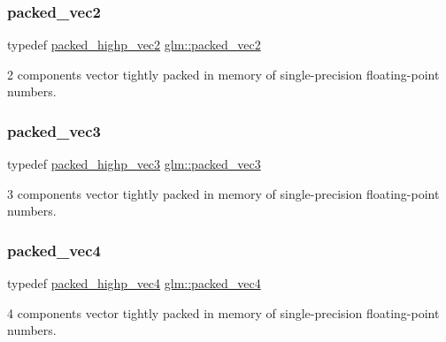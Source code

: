 \subsubsection{\texorpdfstring{packed\+\_\+vec2}{packed\_vec2}}
{\footnotesize\ttfamily typedef \mbox{\hyperlink{group__gtc__type__aligned_ga15068ebf3dae2c205d90b1d36780bf9b}{packed\+\_\+highp\+\_\+vec2}} \mbox{\hyperlink{group__gtc__type__aligned_ga702841b8b37825c9a51d95bc0f7848b2}{glm\+::packed\+\_\+vec2}}}



2 components vector tightly packed in memory of single-\/precision floating-\/point numbers. 

\mbox{\label{group__gtc__type__aligned_ga8e23eba0ebe21b912cd783f69fa3a99b}} 
\subsubsection{\texorpdfstring{packed\+\_\+vec3}{packed\_vec3}}
{\footnotesize\ttfamily typedef \mbox{\hyperlink{group__gtc__type__aligned_ga6814dd861e658e724ce9e5e673a4486b}{packed\+\_\+highp\+\_\+vec3}} \mbox{\hyperlink{group__gtc__type__aligned_ga8e23eba0ebe21b912cd783f69fa3a99b}{glm\+::packed\+\_\+vec3}}}



3 components vector tightly packed in memory of single-\/precision floating-\/point numbers. 

\mbox{\label{group__gtc__type__aligned_gacb6d3e09d6aa52d954934e570b5c4fb1}} 
\subsubsection{\texorpdfstring{packed\+\_\+vec4}{packed\_vec4}}
{\footnotesize\ttfamily typedef \mbox{\hyperlink{group__gtc__type__aligned_gabbc42b2b5ad854c60821526c4e291161}{packed\+\_\+highp\+\_\+vec4}} \mbox{\hyperlink{group__gtc__type__aligned_gacb6d3e09d6aa52d954934e570b5c4fb1}{glm\+::packed\+\_\+vec4}}}



4 components vector tightly packed in memory of single-\/precision floating-\/point numbers. 

